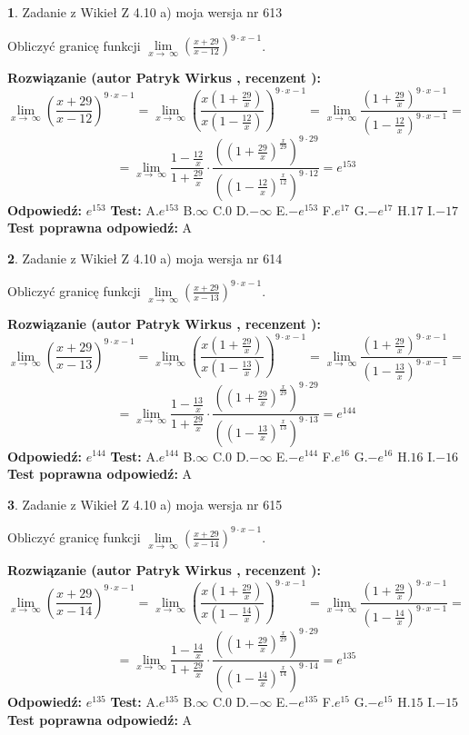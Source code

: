 \documentclass[12pt, a4paper]{article}
\theoremstyle{definition} %
\newtheorem{zad}{}
\newcommand{\zadStart}[1]{\begin{zad}#1\newline}
\newcommand{\zadStop}{\end{zad}}
\newcommand{\rozwStart}[2]{\noindent \textbf{Rozwiązanie (autor #1 , recenzent #2): }\newline}
\newcommand{\rozwStop}{\newline}
\newcommand{\odpStart}{\noindent \textbf{Odpowiedź:}\newline}
\newcommand{\odpStop}{\newline}
\newcommand{\testStart}{\noindent \textbf{Test:}\newline}
\newcommand{\testStop}{\newline}
\newcommand{\kluczStart}{\noindent \textbf{Test poprawna odpowiedź:}\newline}
\newcommand{\kluczStop}{\newline}
\begin{document}
\zadStart{Zadanie z Wikieł Z 4.10 a) moja wersja nr 613}

Obliczyć granicę funkcji  $\lim\limits_{x\to\ \infty}(\frac{x+29}{x-12})^{9\cdot x-1}$.
\zadStop
\rozwStart{Patryk Wirkus}{}
$$\lim\limits_{x\to\ \infty}(\frac{x+29}{x-12})^{9\cdot x-1} = \lim\limits_{x\to\ \infty}(\frac{x(1+\frac{29}{x})}{x(1-\frac{12}{x})})^{9\cdot x-1}=\lim\limits_{x\to\ \infty}\frac{(1+\frac{29}{x})^{9\cdot x-1}}{(1-\frac{12}{x})^{9\cdot x-1}}=$$
$$=\lim\limits_{x\to\ \infty}\frac{1-\frac{12}{x}}{1+\frac{29}{x}}\cdot\frac{((1+\frac{29}{x})^{\frac{x}{29}})^{9\cdot29}}{((1-\frac{12}{x})^{\frac{x}{12}})^{9\cdot12}}=e^{153}$$
\rozwStop
\odpStart
$e^{153}$
\odpStop
\testStart
A.$e^{153}$ B.$\infty$ C.$0$ D.$-\infty$ E.$-e^{153}$
F.$e^{17}$ G.$-e^{17}$
H.$17$
I.$-17$
\testStop
\kluczStart
A
\kluczStop



\zadStart{Zadanie z Wikieł Z 4.10 a) moja wersja nr 614}

Obliczyć granicę funkcji  $\lim\limits_{x\to\ \infty}(\frac{x+29}{x-13})^{9\cdot x-1}$.
\zadStop
\rozwStart{Patryk Wirkus}{}
$$\lim\limits_{x\to\ \infty}(\frac{x+29}{x-13})^{9\cdot x-1} = \lim\limits_{x\to\ \infty}(\frac{x(1+\frac{29}{x})}{x(1-\frac{13}{x})})^{9\cdot x-1}=\lim\limits_{x\to\ \infty}\frac{(1+\frac{29}{x})^{9\cdot x-1}}{(1-\frac{13}{x})^{9\cdot x-1}}=$$
$$=\lim\limits_{x\to\ \infty}\frac{1-\frac{13}{x}}{1+\frac{29}{x}}\cdot\frac{((1+\frac{29}{x})^{\frac{x}{29}})^{9\cdot29}}{((1-\frac{13}{x})^{\frac{x}{13}})^{9\cdot13}}=e^{144}$$
\rozwStop
\odpStart
$e^{144}$
\odpStop
\testStart
A.$e^{144}$ B.$\infty$ C.$0$ D.$-\infty$ E.$-e^{144}$
F.$e^{16}$ G.$-e^{16}$
H.$16$
I.$-16$
\testStop
\kluczStart
A
\kluczStop



\zadStart{Zadanie z Wikieł Z 4.10 a) moja wersja nr 615}

Obliczyć granicę funkcji  $\lim\limits_{x\to\ \infty}(\frac{x+29}{x-14})^{9\cdot x-1}$.
\zadStop
\rozwStart{Patryk Wirkus}{}
$$\lim\limits_{x\to\ \infty}(\frac{x+29}{x-14})^{9\cdot x-1} = \lim\limits_{x\to\ \infty}(\frac{x(1+\frac{29}{x})}{x(1-\frac{14}{x})})^{9\cdot x-1}=\lim\limits_{x\to\ \infty}\frac{(1+\frac{29}{x})^{9\cdot x-1}}{(1-\frac{14}{x})^{9\cdot x-1}}=$$
$$=\lim\limits_{x\to\ \infty}\frac{1-\frac{14}{x}}{1+\frac{29}{x}}\cdot\frac{((1+\frac{29}{x})^{\frac{x}{29}})^{9\cdot29}}{((1-\frac{14}{x})^{\frac{x}{14}})^{9\cdot14}}=e^{135}$$
\rozwStop
\odpStart
$e^{135}$
\odpStop
\testStart
A.$e^{135}$ B.$\infty$ C.$0$ D.$-\infty$ E.$-e^{135}$
F.$e^{15}$ G.$-e^{15}$
H.$15$
I.$-15$
\testStop
\kluczStart
A
\kluczStop
\end{document}
